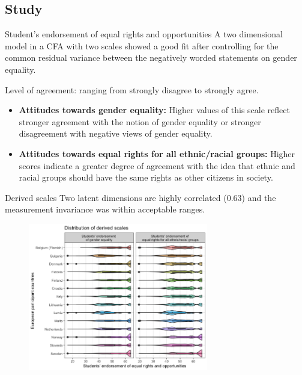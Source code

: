 \documentclass[11pt,t]{beamer}
\begin{document}
\subsection{Study}
\begin{frame}[c,plain]{Student's endorsement of equal rights and opportunities}
\vspace{-11pt}
A two dimensional model in a CFA with two scales showed a good fit after controlling for the common residual variance between the negatively worded statements on gender equality\footnotemark.
\vspace{5pt}

Level of agreement: ranging from strongly disagree to strongly agree.  
\vspace{5pt}
	\begin{itemize}
		\item \textbf{Attitudes towards gender equality:} Higher values of this scale reflect stronger agreement with the notion of gender equality or stronger disagreement with negative views of gender equality.   
\vspace{11pt}
		\item \textbf{Attitudes towards equal rights for all ethnic/racial groups:} Higher scores indicate a greater degree of agreement with the idea that ethnic and racial groups should have the same rights as other citizens in society.  
	\end{itemize}
\end{frame}


\begin{frame}[c,plain]{Derived scales}
\vspace{5pt}
Two latent dimensions are highly correlated (0.63) and the measurement invariance was within acceptable ranges\footnotemark.  
\vspace{-5pt}
\begin{figure}
\centering
	\includegraphics[width=0.7\textwidth]{graphics/derived.png}
\end{figure}	

\end{frame}
\end{document}
